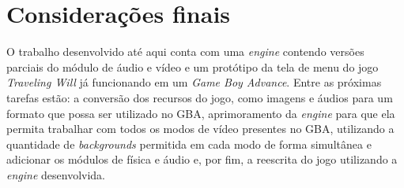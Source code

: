 \chapter[Considerações finais]{Considerações finais}

O trabalho desenvolvido até aqui conta com uma \textit{engine} contendo versões parciais do módulo de áudio e vídeo e um protótipo da tela de menu do jogo \textit{Traveling Will} já funcionando em um \textit{Game Boy Advance}. Entre as próximas tarefas estão: a conversão dos recursos do jogo, como imagens e áudios para um formato que possa ser utilizado no GBA, aprimoramento da \textit{engine} para que ela permita trabalhar com todos os modos de vídeo presentes no GBA, utilizando a quantidade de \textit{backgrounds} permitida em cada modo de forma simultânea e adicionar os módulos de física e áudio e, por fim, a reescrita do jogo utilizando a \textit{engine} desenvolvida.
